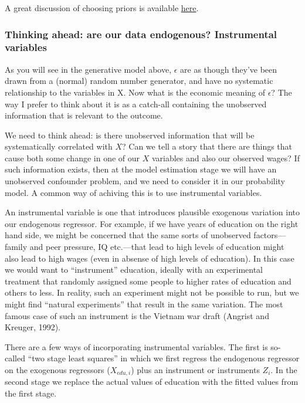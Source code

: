 \documentclass[]{book}
\begin{document}
A great discussion of choosing priors is available
\href{github.com/stan-dev/wiki}{here}.

\subsubsection{Thinking ahead: are our data endogenous? Instrumental
variables}\label{thinking-ahead-are-our-data-endogenous-instrumental-variables}

As you will see in the generative model above, \(\epsilon\) are as
though they've been drawn from a (normal) random number generator, and
have no systematic relationship to the variables in X. Now what is the
economic meaning of \(\epsilon\)? The way I prefer to think about it is
as a catch-all containing the unobserved information that is relevant to
the outcome.

We need to think ahead: is there unobserved information that will be
systematically correlated with \(X\)? Can we tell a story that there are
things that cause both some change in one of our \(X\) variables and
also our observed wages? If such information exists, then at the model
estimation stage we will have an unobserved confounder problem, and we
need to consider it in our probability model. A common way of achiving
this is to use instrumental variables.

An instrumental variable is one that introduces plausible exogenous
variation into our endogenous regressor. For example, if we have years
of education on the right hand side, we might be concerned that the same
sorts of unobserved factors---family and peer pressure, IQ etc.---that
lead to high levels of education might also lead to high wages (even in
absense of high levels of education). In this case we would want to
``instrument'' education, ideally with an experimental treatment that
randomly assigned some people to higher rates of education and others to
less. In reality, such an experiment might not be possible to run, but
we might find ``natural experiments'' that result in the same variation.
The most famous case of such an instrument is the Vietnam war draft
(Angrist and Kreuger, 1992).

There are a few ways of incorporating instrumental variables. The first
is so-called ``two stage least squares'' in which we first regress the
endogenous regressor on the exogenous regressors (\(X_{edu,i}\)) plus an
instrument or instruments \(Z_{i}\). In the second stage we replace the
actual values of education with the fitted values from the first stage.
\end{document}
